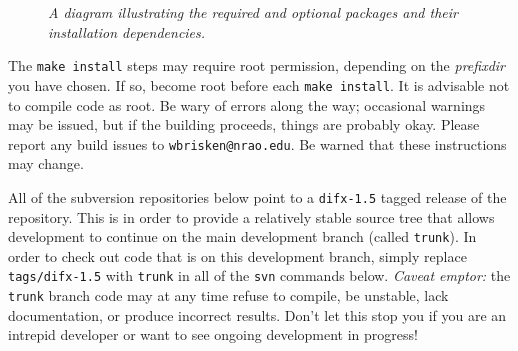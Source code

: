 \begin{figure}[h]
\begin{center}
\caption[dependencies]{
{\em A diagram illustrating the required and optional packages and their installation dependencies.}
\label{fig:dependencies}
}
\end{center}
\end{figure}

The {\tt make install} steps may require root permission, depending on the {\em prefixdir} you have chosen.
If so, become root before each {\tt make install}.  
It is advisable not to compile code as root.
Be wary of errors along the way; occasional warnings may be issued, but if the building proceeds, things are probably okay.
Please report any build issues to {\tt wbrisken@nrao.edu}. 
Be warned that these instructions may change.

All of the subversion repositories below point to a {\tt difx-1.5} tagged release of the repository.
This is in order to provide a relatively stable source tree that allows development to continue on the main development branch (called {\tt trunk}).
In order to check out code that is on this development branch, simply replace {\tt tags/difx-1.5} with {\tt trunk} in all of the {\tt svn} commands below.
{\em Caveat emptor: } the {\tt trunk} branch code may at any time refuse to compile, be unstable, lack documentation, or produce incorrect results.
Don't let this stop you if you are an intrepid developer or want to see ongoing development in progress!









